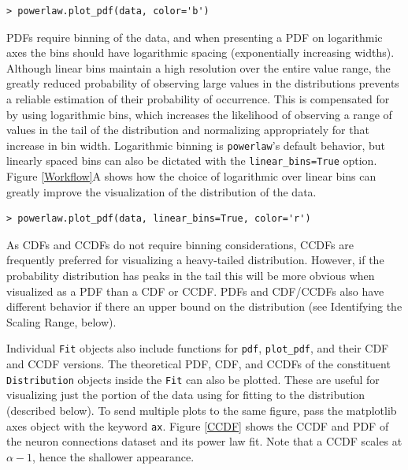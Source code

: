 \documentclass[10pt]{article}
\begin{document}
\begin{verbatim}
> powerlaw.plot_pdf(data, color='b')
\end{verbatim}


PDFs require binning of the data, and when presenting a PDF on logarithmic axes the bins should have logarithmic spacing (exponentially increasing widths). Although linear bins maintain a high resolution over the entire value range, the greatly reduced probability of observing large values in the distributions prevents a reliable estimation of their probability of occurrence. This is compensated for by using logarithmic bins, which increases the likelihood of observing a range of values in the tail of the distribution and normalizing appropriately for that increase in bin width. Logarithmic binning is \verb$powerlaw$'s default behavior, but linearly spaced bins can also be dictated with the \verb"linear_bins=True" option. Figure \ref{Workflow}A shows how the choice of logarithmic over linear bins can greatly improve the visualization of the distribution of the data.

\begin{verbatim}
> powerlaw.plot_pdf(data, linear_bins=True, color='r')
\end{verbatim}

As CDFs and CCDFs do not require binning considerations, CCDFs are frequently preferred for visualizing a heavy-tailed distribution. %
However, if the probability distribution has peaks in the tail this will be more obvious when visualized as a PDF than a CDF or CCDF. PDFs and CDF/CCDFs also have different behavior if there an upper bound on the distribution (see Identifying the Scaling Range, below).

Individual \verb$Fit$ objects also include functions for \verb$pdf$, \verb$plot_pdf$, and their CDF and CCDF versions. The theoretical PDF, CDF, and CCDFs of the constituent \verb$Distribution$ objects inside the \verb$Fit$ can also be plotted. These are useful for visualizing just the portion of the data using for fitting to the distribution (described below). To send multiple plots to the same figure, pass the matplotlib axes object with the keyword \verb$ax$.  Figure \ref{CCDF} shows the CCDF and PDF of the neuron connections dataset and its power law fit. Note that a CCDF scales at $\alpha-1$, hence the shallower appearance.
\end{document}
